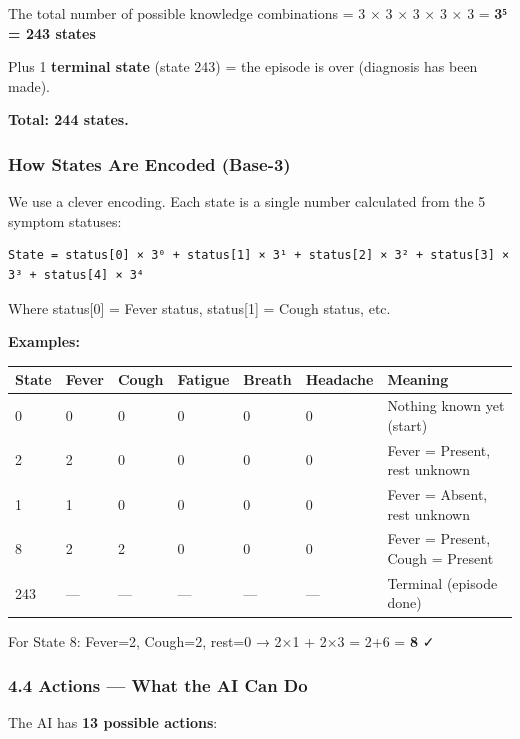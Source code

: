 \documentclass[
]{article}
\begin{document}
The total number of possible knowledge combinations = 3 × 3 × 3 × 3 × 3
= \textbf{3⁵ = 243 states}

Plus 1 \textbf{terminal state} (state 243) = the episode is over
(diagnosis has been made).

\textbf{Total: 244 states.}

\hypertarget{how-states-are-encoded-base-3}{%
\subsubsection{How States Are Encoded
(Base-3)}\label{how-states-are-encoded-base-3}}

We use a clever encoding. Each state is a single number calculated from
the 5 symptom statuses:

\begin{verbatim}
State = status[0] × 3⁰ + status[1] × 3¹ + status[2] × 3² + status[3] × 3³ + status[4] × 3⁴
\end{verbatim}

Where status{[}0{]} = Fever status, status{[}1{]} = Cough status, etc.

\textbf{Examples:}

\begin{longtable}[]{@{}lllllll@{}}
\toprule
State & Fever & Cough & Fatigue & Breath & Headache & Meaning \\
\midrule
\endhead
0 & 0 & 0 & 0 & 0 & 0 & Nothing known yet (start) \\
2 & 2 & 0 & 0 & 0 & 0 & Fever = Present, rest unknown \\
1 & 1 & 0 & 0 & 0 & 0 & Fever = Absent, rest unknown \\
8 & 2 & 2 & 0 & 0 & 0 & Fever = Present, Cough = Present \\
243 & --- & --- & --- & --- & --- & Terminal (episode done) \\
\bottomrule
\end{longtable}

For State 8: Fever=2, Cough=2, rest=0 → 2×1 + 2×3 = 2+6 = \textbf{8} ✓

\hypertarget{actions-what-the-ai-can-do}{%
\subsubsection{4.4 Actions --- What the AI Can
Do}\label{actions-what-the-ai-can-do}}

The AI has \textbf{13 possible actions}:
\end{document}
